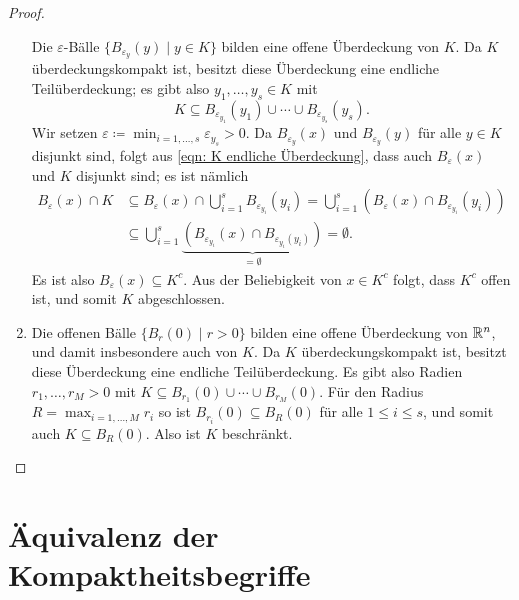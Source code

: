 \documentclass[a4paper,10pt]{article}
\begin{document}
\begin{proof}
\begin{enumerate}
   Die $\varepsilon$-Bälle $\{B_{\varepsilon_y}(y) \mid y \in K\}$ bilden eine offene Überdeckung von $K$. Da $K$ überdeckungskompakt ist, besitzt diese Überdeckung eine endliche Teilüberdeckung; es gibt also $y_1, \dotsc, y_s \in K$ mit
   \begin{equation}\label{eqn: K endliche Überdeckung}
    K \subseteq B_{\varepsilon_{y_1}}(y_1) \cup \dotsb \cup B_{\varepsilon_{y_s}}(y_s).
   \end{equation}
   Wir setzen $\varepsilon \coloneqq \min_{i=1,\dotsc,s} \varepsilon_{y_s} > 0$. Da $B_{\varepsilon_y}(x)$ und $B_{\varepsilon_y}(y)$ für alle $y \in K$ disjunkt sind, folgt aus \eqref{eqn: K endliche Überdeckung}, dass auch $B_\varepsilon(x)$ und $K$ disjunkt sind; es ist nämlich
   \begin{align*}
    B_\varepsilon(x) \cap K
    &\subseteq B_\varepsilon(x) \cap \bigcup_{i=1}^s B_{\varepsilon_{y_i}}(y_i)
    = \bigcup_{i=1}^s (B_\varepsilon(x) \cap B_{\varepsilon_{y_i}}(y_i)) \\
    &\subseteq \bigcup_{i=1}^s \underbrace{(B_{\varepsilon_{y_i}}(x) \cap B_{\varepsilon_{y_i}(y_i)})}_{= \emptyset}
    = \emptyset.
   \end{align*}
   Es ist also $B_\varepsilon(x) \subseteq K^c$. Aus der Beliebigkeit von $x \in K^c$ folgt, dass $K^c$ offen ist, und somit $K$ abgeschlossen.
  \item
   Die offenen Bälle $\{B_r(0) \mid r > 0\}$ bilden eine offene Überdeckung von $\mathbb{R}^n$, und damit insbesondere auch von $K$. Da $K$ überdeckungskompakt ist, besitzt diese Überdeckung eine endliche Teilüberdeckung. Es gibt also Radien $r_1, \dotsc, r_M > 0$ mit $K \subseteq B_{r_1}(0) \cup \dotsb \cup B_{r_M}(0)$. Für den Radius $R = \max_{i=1,\dotsc,M} r_i$ so ist $B_{r_i}(0) \subseteq B_R(0)$ für alle $1 \leq i \leq s$, und somit auch $K \subseteq B_R(0)$. Also ist $K$ beschränkt.
  \qedhere
 \end{enumerate}
\end{proof}





\section{Äquivalenz der Kompaktheitsbegriffe}
\end{document}
